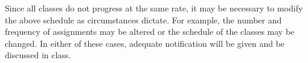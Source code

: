     Since all classes do not progress at the same rate, it may be necessary to modify the above schedule as circumstances dictate. For example, the number and frequency of assignments may be altered or the schedule of the classes may be changed. In either of these cases, adequate notification will be given and be discussed in class.
    
